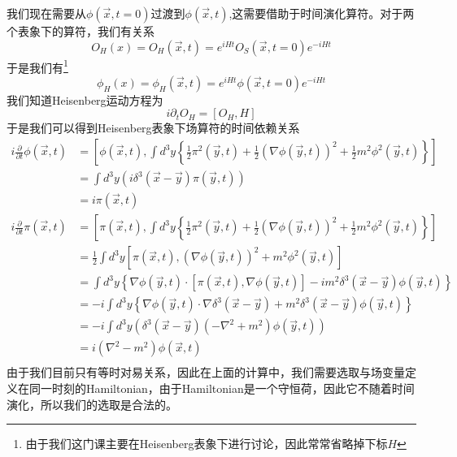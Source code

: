我们现在需要从$\phi(\vec{x},t=0)$过渡到$\phi(\vec{x},t)$,这需要借助于时间演化算符。对于两个表象下的算符，我们有关系
\begin{equation}
    O_{H}(x)=O_{H}(\vec{x},t)=e^{iHt}O_{S}(\vec{x},t=0)e^{-iHt}
\end{equation}
于是我们有\footnote{由于我们这门课主要在Heisenberg表象下进行讨论，因此常常省略掉下标$H$}
\begin{equation}
\label{chap3fieldtime}
    \phi_{H}(x)=\phi_{H}(\vec{x},t)=e^{iHt}\phi(\vec{x},t=0)e^{-iHt}
\end{equation}
我们知道Heisenberg运动方程为
\begin{equation}
    i\partial_{t}O_{H}=[O_{H},H]
\end{equation}
于是我们可以得到Heisenberg表象下场算符的时间依赖关系
\begin{equation}
\label{chap3Heise}
    \begin{aligned}
        i\frac{\partial}{\partial t}\phi(\vec{x},t)&=\left[\phi(\vec{x},t), \int d^{3}y\left\{\frac{1}{2}\pi^{2}(\vec{y},t)+\frac{1}{2}(\nabla \phi(\vec{y},t))^{2}+\frac{1}{2}m^{2}\phi^{2}(\vec{y},t)\right\}\right]\\
        &=\int d^{3}y\left(i\delta^{3}(\vec{x}-\vec{y})\pi(\vec{y},t)\right)\\
        &=i\pi(\vec{x},t)\\
        i\frac{\partial}{\partial t}\pi(\vec{x},t)&=\left[\pi(\vec{x},t), \int d^{3}y\left\{\frac{1}{2}\pi^{2}(\vec{y},t)+\frac{1}{2}(\nabla \phi(\vec{y},t))^{2}+\frac{1}{2}m^{2}\phi^{2}(\vec{y},t)\right\}\right]\\
         &=\frac{1}{2}\int d^{3}y\left[\pi(\vec{x},t),(\nabla \phi(\vec{y},t))^{2}+m^{2}\phi^{2}(\vec{y},t)\right]\\
          &=\int d^{3}y\left\{\nabla\phi(\vec{y},t)\cdot\left[\pi(\vec{x},t),\nabla \phi(\vec{y},t)\right]-im^{2}\delta^{3}(\vec{x}-\vec{y})\phi(\vec{y},t)\right\}\\
            &=-i\int d^{3}y\left\{\nabla\phi(\vec{y},t)\cdot\nabla\delta^{3}(\vec{x}-\vec{y})+m^{2}\delta^{3}(\vec{x}-\vec{y})\phi(\vec{y},t)\right\}\\
        &=-i\int d^{3}y\left(\delta^{3}(\vec{x}-\vec{y})(-\nabla^{2}+m^{2})\phi(\vec{y},t)\right)\\
        &=i(\nabla^{2}-m^{2})\phi(\vec{x},t)\\
    \end{aligned}
\end{equation}
由于我们目前只有等时对易关系，因此在上面的计算中，我们需要选取与场变量定义在同一时刻的Hamiltonian，由于Hamiltonian是一个守恒荷，因此它不随着时间演化，所以我们的选取是合法的。

